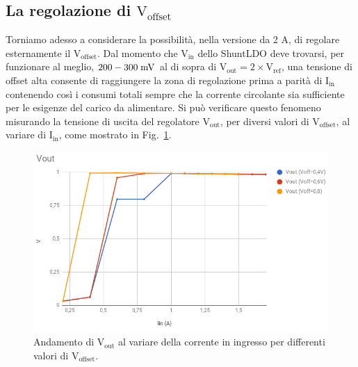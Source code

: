 \subsection{La regolazione di  $\mathrm{V_{offset}}$}

Torniamo adesso a considerare la possibilità, nella versione da 2 A, di regolare esternamente il $\mathrm{V_{offset}}$. 
Dal momento che $\mathrm{V_{in}}$ dello ShuntLDO deve trovarsi, per funzionare al meglio, $200-300\rm \; mV$ al di sopra di $\mathrm{V_{out}=2\times V_{ref}}$, una tensione di offset alta consente di raggiungere la zona di regolazione prima a parit\`a di $\mathrm{I_{in}}$ contenendo cos\`i i consumi totali sempre che la corrente circolante sia sufficiente per le esigenze del carico da alimentare.
Si può verificare questo fenomeno misurando la tensione di uscita del regolatore $\mathrm{V_{out}}$, per diversi valori di $\mathrm{V_{offset}}$, al variare di $\mathrm{I_{in}}$, come mostrato in Fig.~\ref{VoutVsVoffset}.
\begin{figure}
\centering
\includegraphics[scale=.4]{Immagini/VoutVsVoffset}
\caption{Andamento di $\mathrm{V_{out}}$ al variare della corrente in ingresso per differenti valori di $\mathrm{V_{offset}}$.}
\label{VoutVsVoffset}
\end{figure}


